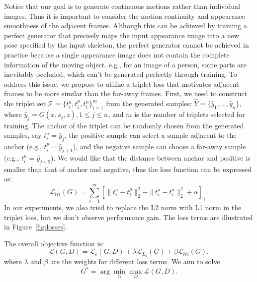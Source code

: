 \documentclass[journal]{IEEEtran}
\begin{document}
Notice that our goal is to generate continuous motions rather than individual images. Thus it is important to consider the motion continuity and appearance smoothness of the adjacent frames. Although this can be achieved by training a perfect generator that precisely maps the input appearance image into a new pose specified by the input skeleton, the perfect generator cannot be achieved in practice because a single appearance image does not contain the complete information of the moving object. e.g., for an image of a person, some parts are inevitably occluded, which can't be generated perfectly through training. To address this issue, we propose to utilize a triplet loss that motivates adjacent frames to be more similar than the far-away frames. First, we need to construct the triplet set $\mathcal{T} = \{t^a_i, t^p_i, t^n_i\}_{i=1}^{m}$ from the generated samples: $\hat{Y}=\{\hat{y}_1,...,\hat{y}_n\}$,
where $\hat{y}_j = G(x, s_j, z), 1\le j \le n$, and $m$ is the number of triplets selected for training. The anchor of the triplet can be randomly chosen from the generated samples, say $t^a_i= \hat{y}_j$, the positive sample can select a sample adjacent to the anchor (e.g., $t^p_i= \hat{y}_{j+1}$), and the negative sample can choose a far-away sample (e.g., $t^n_i= \hat{y}_{j+5}$). We would like that the distance between anchor and positive is smaller than that of anchor and negative, thus the loss function can be expressed as:
\begin{equation}
\mathcal{L}_{tri}(G) = \sum_{i=1}^{m}[\|t^a_i-t^p_i\|_2^2-\|t^a_i-t^n_i\|_2^2 + \alpha]_{+}.
\end{equation}
In our experiments, we also tried to replace the L2 norm with L1 norm in the triplet loss, but we don't observe performance gain. The loss terms are illustrated in Figure~\ref{fig:losses}.

The overall objective function is:
\begin{equation}
\mathcal{L}(G,D)=\mathcal{L}_{c}(G,D)+\lambda\mathcal{L}_{L_1}(G)+\beta\mathcal{L}_{tri}(G),
\label{eq:l}
\end{equation}
where $\lambda$ and $\beta$ are the weights for different loss terms.
We aim to solve
\begin{equation}
G^{*}=\arg\min \limits_{G}\max \limits_{D}\mathcal{L}(G,D).
\end{equation}
\end{document}
